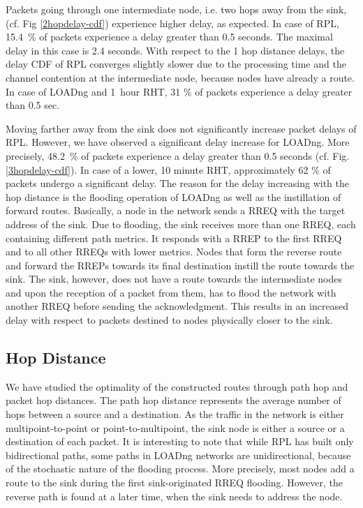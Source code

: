 \documentclass[conference,10pt,a4paper]{IEEEtran}
\begin{document}
Packets going through one intermediate node, i.e. two hops away from the sink, (cf. Fig \ref{2hopdelay-cdf})
 experience higher delay, as expected. In case of RPL, 15.4~\% of packets
 experience a delay greater than 0.5 seconds. The maximal delay in this case is
 2.4 seconds. With respect to the 1 hop distance delays, the delay CDF of RPL
 converges slightly slower due to the processing time and the channel contention
 at the intermediate node, because nodes have already a route. 
 In case of LOADng and 1~hour RHT, 31 \% of packets experience a delay
 greater than 0.5 sec.


Moving farther away from the sink does not significantly increase packet delays
of RPL. 
However, we have observed a significant delay increase for LOADng. 
More precisely, 48.2~\% of packets experience a delay greater than 0.5 seconds
(cf. Fig. \ref{3hopdelay-cdf}). In case of a lower, 10 minute RHT,
approximately 62 \% of packets undergo a significant delay. The reason for the
delay increasing with the hop distance is the flooding operation of LOADng as well
as the instillation of forward routes. Basically, a node in the network 
sends a RREQ with the target address of the sink. 
Due to flooding, the sink receives more than one RREQ, each containing different
path metrics. 
It responds with a RREP to the first RREQ and to all other RREQs with lower
metrics. 
Nodes that form the reverse route and forward the RREPs towards its final
destination instill the route towards the sink. 
The sink, however, does not have
a route towards the intermediate nodes and upon the reception of a packet from
them, has to flood the network with another RREQ before sending the
acknowledgment. This results in an increased delay with respect to packets
destined to nodes physically closer to the sink.


\vspace{-0.2cm}\subsection{Hop Distance}
\label{hop-distance} 

We have studied the optimality of the constructed routes through
path hop and packet hop distances. 
The path hop distance represents the average number of hops between a source and
a destination. As the traffic in the 
network is either multipoint-to-point or point-to-multipoint, the sink node is
either a source or a destination of each packet. It is interesting to note that
while RPL has built only bidirectional paths, some paths in LOADng networks are
unidirectional, because of the stochastic nature of the flooding process. 
More precisely, most nodes add a route to the sink during the first
sink-originated RREQ flooding. However, the reverse path is found at a later
time, when the sink needs to address the node. 
\end{document}
